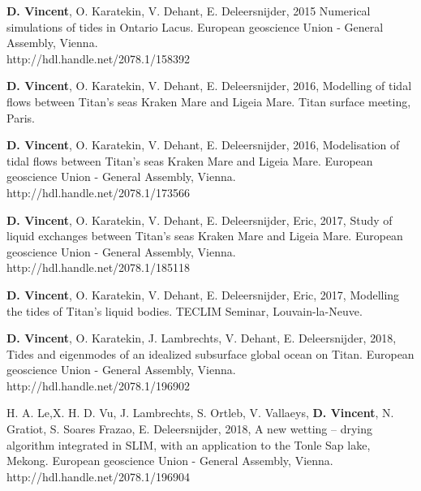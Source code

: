 
\begin{list}{}{%
\setlength{\topsep}{0pt}%
\setlength{\leftmargin}{0.23in}%
\setlength{\listparindent}{-0.23in}%
\setlength{\itemindent}{-0.23in}%
\setlength{\parsep}{\parskip}%
}%

\item \textbf{D. Vincent}, O. Karatekin, V. Dehant, E. Deleersnijder, 2015 Numerical simulations of tides in Ontario Lacus. European geoscience Union - General Assembly, Vienna. \\http://hdl.handle.net/2078.1/158392

\item \textbf{D. Vincent}, O. Karatekin, V. Dehant, E. Deleersnijder, 2016, Modelling of tidal flows between Titan's seas Kraken Mare and Ligeia Mare. Titan surface meeting, Paris.

\item \textbf{D. Vincent}, O. Karatekin, V. Dehant, E. Deleersnijder, 2016, Modelisation of tidal flows between Titan's seas Kraken Mare and Ligeia Mare. European geoscience Union - General Assembly, Vienna.\\
http://hdl.handle.net/2078.1/173566

\item \textbf{D. Vincent}, O. Karatekin, V. Dehant, E. Deleersnijder, Eric, 2017, Study of liquid exchanges between Titan's seas Kraken Mare and Ligeia Mare. European geoscience Union - General Assembly, Vienna. \\
http://hdl.handle.net/2078.1/185118

\item \textbf{D. Vincent}, O. Karatekin, V. Dehant, E. Deleersnijder, Eric, 2017, Modelling the tides of Titan's liquid bodies. TECLIM Seminar, Louvain-la-Neuve.

\item \textbf{D. Vincent}, O. Karatekin, J. Lambrechts, V. Dehant, E. Deleersnijder, 2018, Tides and eigenmodes of an idealized subsurface global ocean on Titan. European geoscience Union - General Assembly, Vienna. \\
http://hdl.handle.net/2078.1/196902

\item H. A. Le,X. H. D. Vu, J. Lambrechts, S. Ortleb, V. Vallaeys, \textbf{D. Vincent}, N. Gratiot, S. Soares Frazao, E. Deleersnijder, 2018, A new wetting – drying algorithm integrated in SLIM, with an application to the Tonle Sap lake, Mekong. European geoscience Union - General Assembly, Vienna.\\ http://hdl.handle.net/2078.1/196904







\end{list}
